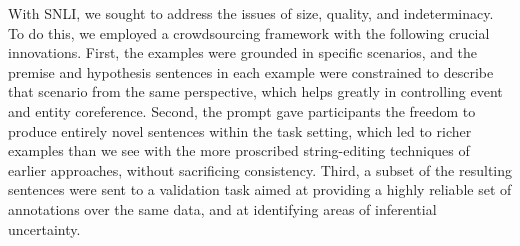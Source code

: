 With SNLI, we sought to address the issues of size, quality, and
indeterminacy. To do this, we employed a crowdsourcing framework with
the following crucial innovations. First, the examples were grounded
in specific scenarios, and the premise and hypothesis sentences in each example 
were constrained to describe that scenario from the same perspective, 
which helps greatly in controlling event and entity coreference. Second, the prompt
gave participants the freedom to produce entirely novel sentences
within the task setting, which led to richer examples than we see with
the more proscribed string-editing techniques of earlier approaches,
without sacrificing consistency. Third, a subset of the resulting
sentences were sent to a validation task aimed at providing a highly 
reliable set of annotations over the same data, and at identifying areas of inferential uncertainty.






